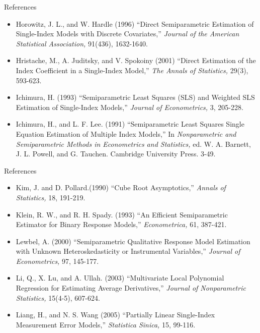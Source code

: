 \documentclass[xcolor=svgnames,dvipdfmx,cjk]{beamer}
\theoremstyle{example}
\begin{document}
\begin{frame}{References}
 \begin{itemize}
  \item Horowitz, J. L., and W. Hardle (1996)
        ``Direct Semiparametric Estimation of Single-Index Models with Discrete Covariates,''
        \textit{Journal of the American Statistical Association,} 91(436), 1632-1640.
  \item Hristache, M., A. Juditsky, and V. Spokoiny (2001)
        ``Direct Estimation of the Index Coefficient in a Single-Index Model,''
        \textit{The Annals of Statistics,} 29(3), 593-623.
  \item Ichimura, H. (1993) 
        ``Semiparametric Least Squares (SLS) and Weighted SLS Estimation of Single-Index Models,''
        \textit{Journal of Econometrics,} 3, 205-228.
  \item Ichimura, H., and L. F. Lee. (1991)
        ``Semiparametric Least Squares Single Equation Estimation of Multiple Index Models,'' 
        In \textit{Nonparametric and Semiparametric Methods in Econometrics and Statistics,} 
        ed. W. A. Barnett, J. L. Powell, and G. Tauchen. Cambridge University Press. 3-49.
 \end{itemize} 
\end{frame}

\begin{frame}{References}
\begin{itemize}
  \item Kim, J. and D. Pollard.(1990)
      ``Cube Root Asymptotics,''
      \textit{Annals of Statistics,} 18, 191-219.
  \item Klein, R. W., and R. H. Spady. (1993)
      ``An Efficient Semiparametric Estimator for Binary Response Models,''
      \textit{Econometrica,} 61, 387-421.
  \item Lewbel, A. (2000)
        ``Semiparametric Qualitative Response Model Estimation with Unknown Heteroskedasticity or Instrumental Variables,''
        \textit{Journal of Econometrics,} 97, 145-177.
  \item Li, Q., X. Lu, and A. Ullah. (2003)
      ``Multivariate Local Polynomial Regression for Estimating Average Derivatives,''
      \textit{Journal of Nonparametric Statistics,} 15(4-5), 607-624.
  \item Liang, H., and N. S. Wang (2005) 
      ``Partially Linear Single-Index Measurement Error Models,'' 
      \textit{Statistica Sinica,} 15, 99-116.
  \end{itemize}
\end{frame}
\end{document}

